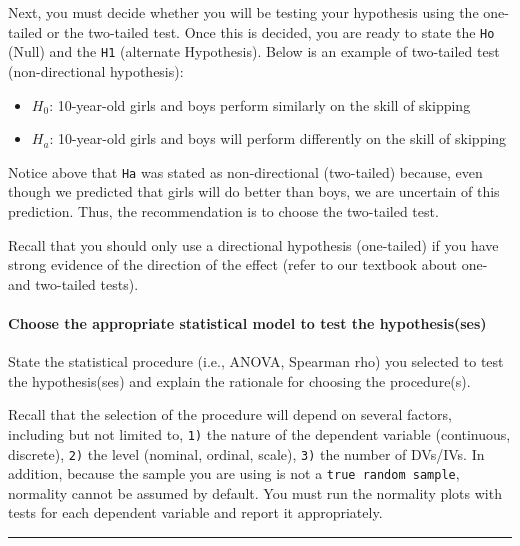 \documentclass[
]{article}
\providecommand{\tightlist}{%
  \setlength{\itemsep}{0pt}\setlength{\parskip}{0pt}}
\begin{document}
Next, you must decide whether you will be testing your hypothesis using the one-tailed or the two-tailed test. Once this is decided, you are ready to state the \texttt{Ho} (Null) and the \texttt{H1} (alternate Hypothesis). Below is an example of two-tailed test (non-directional hypothesis):

\begin{itemize}
\tightlist
\item
  \(H_0\): 10-year-old girls and boys perform similarly on the skill of skipping
\item
  \(H_a\): 10-year-old girls and boys will perform differently on the skill of skipping
\end{itemize}

Notice above that \texttt{Ha} was stated as non-directional (two-tailed) because, even though we predicted that girls will do better than boys, we are uncertain of this prediction. Thus, the recommendation is to choose the two-tailed test.

Recall that you should only use a directional hypothesis (one-tailed) if you have strong evidence of the direction of the effect (refer to our textbook about one- and two-tailed tests).

\hypertarget{choose-the-appropriate-statistical-model-to-test-the-hypothesisses}{%
\paragraph{Choose the appropriate statistical model to test the hypothesis(ses)}\label{choose-the-appropriate-statistical-model-to-test-the-hypothesisses}}

State the statistical procedure (i.e., ANOVA, Spearman rho) you selected to test the hypothesis(ses) and explain the rationale for choosing the procedure(s).

Recall that the selection of the procedure will depend on several factors, including but not limited to, \texttt{1)} the nature of the dependent variable (continuous, discrete), \texttt{2)} the level (nominal, ordinal, scale), \texttt{3)} the number of DVs/IVs. In addition, because the sample you are using is not a \texttt{true\ random\ sample}, normality cannot be assumed by default. You must run the normality plots with tests for each dependent variable and report it appropriately.

\begin{center}\rule{0.5\linewidth}{0.5pt}\end{center}
\end{document}
